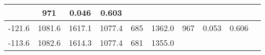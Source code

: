 \documentclass[a4paper,10pt]{article}
\begin{document}
\begin{longtable}{
     |
%    
    c|
%    
    c|
%    
    c|
%    
    c|
%    
    c|
%    
    c|
%    
    c|
%    
    c|
%    
    c|
%    
    c|
%    
    }
%        
        & 971
%        

%        

%        
        & 0.046
%        

%        

%        
        & 0.603
%        

%        
        \\
        \hline

        

%        

%        
        -121.6
%        

%        

%        
        & 1081.6
%        

%        

%        
        & 1617.1
%        

%        

%        
        & 1077.4
%        

%        

%        
        & 685
%        

%        

%        
        & 1362.0
%        

%        

%        
        & 967
%        

%        

%        
        & 0.053
%        

%        

%        
        & 0.606
%        

%        
        \\
        \hline

        

%        

%        
        -113.6
%        

%        

%        
        & 1082.6
%        

%        

%        
        & 1614.3
%        

%        

%        
        & 1077.4
%        

%        

%        
        & 681
%        

%        

%        
        & 1355.0
%        

%        


\end{longtable}
\end{document}

